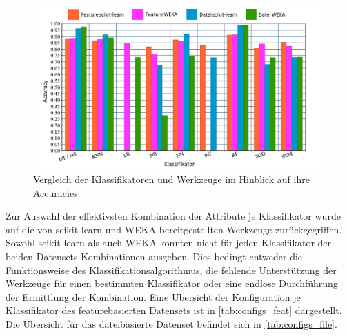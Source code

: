 \begin{figure}[]
    \centering
    \includegraphics[width=\textwidth]{images/Vergleich1}
    \caption{Vergleich der Klassifikatoren und Werkzeuge im Hinblick auf ihre Accuracies\label{fig:vergl1}}
\end{figure}

Zur Auswahl der effektivsten Kombination der Attribute je Klassifikator wurde auf die von scikit-learn und WEKA bereitgestellten Werkzeuge zurückgegriffen. Sowohl scikit-learn als auch WEKA konnten nicht für jeden Klassifikator der beiden Datensets Kombinationen ausgeben. Dies bedingt entweder die Funktionsweise des Klassifikationsalgorithmus, die fehlende Unterstützung der Werkzeuge für einen bestimmten Klassifikator oder eine endlose Durchführung der Ermittlung der Kombination. Eine Übersicht der Konfiguration je Klassifikator des featurebasierten Datensets ist in \autoref{tab:configs_feat} dargestellt. Die Übersicht für das dateibasierte Datenset befindet sich in \autoref{tab:configs_file}.

